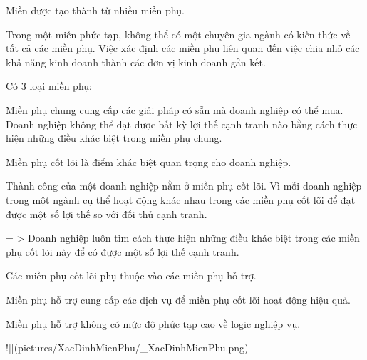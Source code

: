 
Miền được tạo thành từ nhiều miền phụ.


Trong một miền phức tạp, không thể có một chuyên gia ngành có kiến thức về tất cả các miền phụ.
Việc xác định các miền phụ liên quan đến việc chia nhỏ các khả năng kinh doanh thành các đơn vị kinh doanh gắn kết.


Có 3 loại miền phụ:


Miền phụ chung cung cấp các giải pháp có sẵn mà doanh nghiệp có thể mua.
Doanh nghiệp không thể đạt được bất kỳ lợi thế cạnh tranh nào bằng cách thực hiện những điều khác biệt trong miền phụ chung.



Miền phụ cốt lõi là điểm khác biệt quan trọng cho doanh nghiệp.

Thành công của một doanh nghiệp nằm ở miền phụ cốt lõi. Vì mỗi doanh nghiệp trong một ngành cụ thể hoạt động khác nhau trong các miền phụ cốt lõi để đạt được một số lợi thế so với đối thủ cạnh tranh.

= > Doanh nghiệp luôn tìm cách thực hiện những điều khác biệt trong các miền phụ cốt lõi này để có được một số lợi thế cạnh tranh.



Các miền phụ cốt lõi phụ thuộc vào các miền phụ hỗ trợ.

Miền phụ hỗ trợ cung cấp các dịch vụ để miền phụ cốt lõi hoạt động hiệu quả.

Miền phụ hỗ trợ không có mức độ phức tạp cao về logic nghiệp vụ.



![](pictures/XacDinhMienPhu/_XacDinhMienPhu.png)


